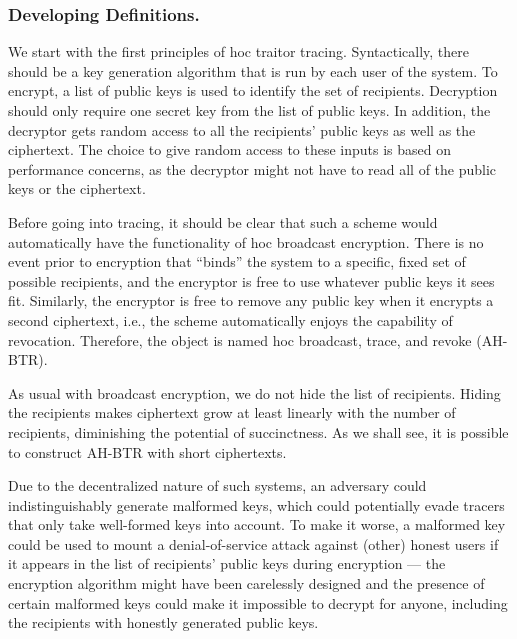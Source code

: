 \subsubsection{Developing Definitions.}
We start with the first principles of \ad hoc traitor tracing.
Syntactically, there should be a key generation algorithm that is run by each user of the system.
To encrypt, a list of public keys is used to identify the set of recipients.
Decryption should only require one secret key from the list of public keys.
In addition, the decryptor gets random access to all the recipients' public keys as well as the ciphertext.
The choice to give random access to these inputs is based on performance concerns, as the decryptor might not have to read all of the public keys or the ciphertext.

Before going into tracing, it should be clear that such a scheme would automatically have the functionality of \ad hoc broadcast encryption.
There is no event prior to encryption that ``binds'' the system to a specific, fixed set of possible recipients, and the encryptor is free to use whatever public keys it sees fit.
Similarly, the encryptor is free to remove any public key when it encrypts a second ciphertext, i.e., the scheme automatically enjoys the capability of revocation.
Therefore, the object is named \ad hoc broadcast, trace, and revoke (AH-BTR).

As usual with broadcast encryption, we do not hide the list of recipients.
Hiding the recipients makes ciphertext grow at least linearly with the number of recipients, diminishing the potential of succinctness.
As we shall see, it is possible to construct AH-BTR with short ciphertexts.

Due to the decentralized nature of such systems,
an adversary could indistinguishably generate malformed keys,
which could potentially evade tracers that only take well-formed keys into account.
To make it worse, a malformed key could be used to mount a denial-of-service attack against (other) honest users if it appears in the list of recipients' public keys during encryption ---
the encryption algorithm might have been carelessly designed and the presence of certain malformed keys could make it impossible to decrypt for anyone, including the recipients with honestly generated public keys.

